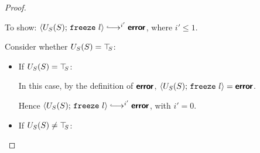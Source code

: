 \begin{proof}
\begin{itemize}
    To show: $\config{U_S(S)}{\freeze{l}} \parstepsto^{i'} \error$,
    where $i' \leq 1$.

    Consider whether $U_S(S) = \top\hspace{-0.85mm}_{S}$:
    \begin{itemize}

    \item If $U_S(S) = \top\hspace{-0.85mm}_{S}$:

      In this case, by the definition of $\textbf{\textsf{error}}$,
      $\langle U_S(S);\, \mbox{\texttt{freeze}}~l \rangle = \textbf{\textsf{error}}$.

      Hence $\config{U_S(S)}{\freeze{l}}
      \parstepsto^{i'} \error$, with $i' = 0$.

    \item If $U_S(S) \neq \top\hspace{-0.85mm}_{S}$:


    \end{itemize}

  \end{itemize}

\end{proof}
